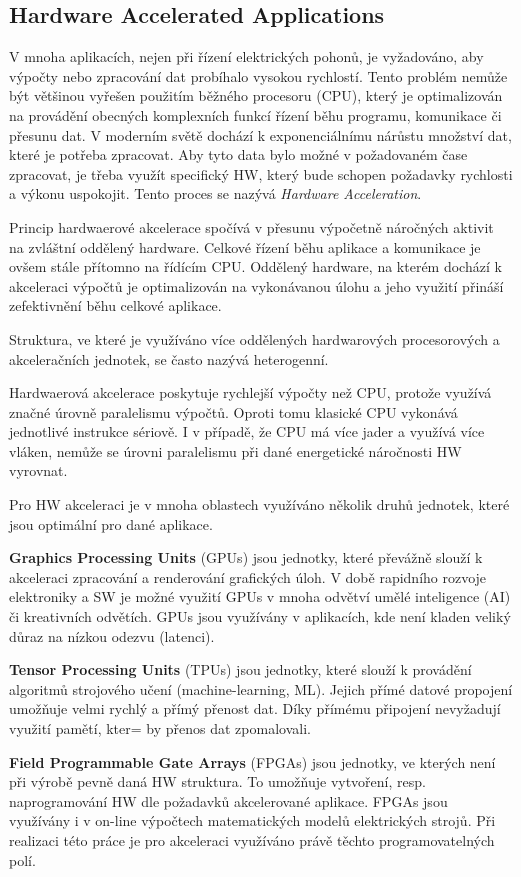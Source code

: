 \documentclass[a4paper, twoside, 11pt]{article}
\begin{document}
		\subsection{Hardware Accelerated Applications}\label{subsec:hardware-accelerated-applications}
		V mnoha aplikacích, nejen při řízení elektrických pohonů, je vyžadováno, aby výpočty nebo zpracování dat probíhalo vysokou rychlostí. Tento problém nemůže být většinou vyřešen použitím běžného procesoru (CPU), který je optimalizován na provádění obecných komplexních funkcí řízení běhu programu, komunikace či přesunu dat. V moderním světě dochází k exponenciálnímu nárůstu množství dat, které je potřeba zpracovat. Aby tyto data bylo možné v požadovaném čase zpracovat, je třeba využít specifický HW, který bude schopen požadavky rychlosti a výkonu uspokojit. Tento proces se nazývá \textit{Hardware Acceleration}. \cite{xilinx-accelerated-computing}\par
		Princip hardwaerové akcelerace spočívá v přesunu výpočetně náročných aktivit na zvláštní oddělený hardware. Celkové řízení běhu aplikace a komunikace je ovšem stále přítomno na řídícím CPU. Oddělený hardware, na kterém dochází k akceleraci výpočtů je optimalizován na vykonávanou úlohu a jeho využití přináší zefektivnění běhu celkové aplikace. \cite{xilinx-accelerated-computing}\par
		Struktura, ve které je využíváno více oddělených hardwarových procesorových a akceleračních jednotek, se často nazývá heterogenní. \cite{xilinx-accelerated-computing}\par
		Hardwaerová akcelerace poskytuje rychlejší výpočty než CPU, protože využívá značné úrovně paralelismu výpočtů. Oproti tomu klasické CPU vykonává jednotlivé instrukce sériově. I v případě, že CPU má více jader a využívá více vláken, nemůže se úrovni paralelismu při dané energetické náročnosti HW vyrovnat.\par
		Pro HW akceleraci je v mnoha oblastech využíváno několik druhů jednotek, které jsou optimální pro dané aplikace.\par
		\textbf{Graphics Processing Units} (GPUs) jsou jednotky, které převážně slouží k akceleraci zpracování a renderování grafických úloh. V době rapidního rozvoje elektroniky a SW je možné využití GPUs v mnoha odvětví umělé inteligence (AI) či kreativních odvětích. GPUs jsou využívány v aplikacích, kde není kladen veliký důraz na nízkou odezvu (latenci). \cite{xilinx-accelerated-computing}\par
		\textbf{Tensor Processing Units} (TPUs) jsou jednotky, které slouží k provádění algoritmů strojového učení (machine-learning, ML). Jejich přímé datové propojení umožňuje velmi rychlý a přímý přenost dat. Díky přímému připojení nevyžadují využití pamětí, kter= by přenos dat zpomalovali. \cite{xilinx-accelerated-computing}\par
		\textbf{Field Programmable Gate Arrays} (FPGAs) jsou jednotky, ve kterých není při výrobě pevně daná HW struktura. To umožňuje vytvoření, resp. naprogramování HW dle požadavků akcelerované aplikace. FPGAs jsou využívány i v on-line výpočtech matematických modelů elektrických strojů. Při realizaci této práce je pro akceleraci využíváno právě těchto programovatelných polí.
\end{document}
